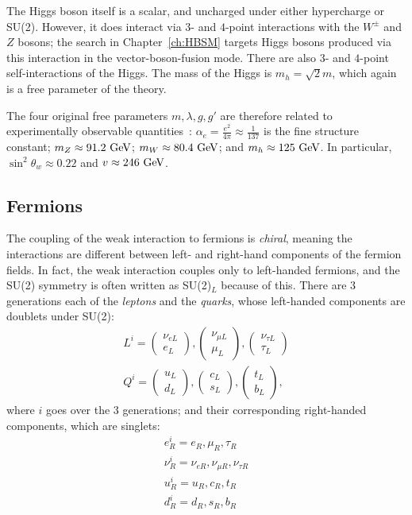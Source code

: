 The Higgs boson itself is a scalar, and uncharged under either hypercharge or SU(2).
However, it does interact via $3$- and $4$-point interactions with the $W^\pm$ and $Z$ bosons; the search in Chapter~\ref{ch:HBSM} targets Higgs bosons produced via this interaction in the vector-boson-fusion mode.
There are also $3$- and $4$-point self-interactions of the Higgs.
The mass of the Higgs is $m_h = \sqrt{2}m$, which again is a free parameter of the theory.

The four original free parameters $m,\lambda,g,g'$ are therefore related to experimentally observable quantities~\cite{PDG}: $\alpha_e = \frac{e^2}{4\pi} \approx \frac{1}{137}$ is the fine structure constant; $m_Z \approx 91.2~\mathrm{GeV}$; $m_W \approx 80.4~\mathrm{GeV}$; and $m_h \approx 125~\mathrm{GeV}$.
In particular, $\sin^2\theta_w \approx 0.22$ and $v \approx 246~\mathrm{GeV}$.

\subsection{Fermions}
\label{sec:SM:EW_matter}
The coupling of the weak interaction to fermions is \textit{chiral}, meaning the interactions are different between left- and right-hand components of the fermion fields.
In fact, the weak interaction couples only to left-handed fermions, and the SU(2) symmetry is often written as SU(2)$_L$ because of this.
There are $3$ generations each of the \textit{leptons} and the \textit{quarks}, whose left-handed components are doublets under SU(2):
\begin{align}
L^i = \begin{pmatrix}\nu_{eL}\\e_L\end{pmatrix},\begin{pmatrix}\nu_{\mu L}\\\mu_L\end{pmatrix},\begin{pmatrix}\nu_{\tau L}\\\tau_L\end{pmatrix}\\
Q^i = \begin{pmatrix}u_{L}\\d_L\end{pmatrix},\begin{pmatrix}c_{L}\\s_L\end{pmatrix},\begin{pmatrix}t_{L}\\b_L\end{pmatrix},
\end{align}
where $i$ goes over the $3$ generations; and their corresponding right-handed components, which are singlets:
\begin{align}
e^i_R = e_R,\mu_R,\tau_R\\
\nu^i_R = \nu_{eR},\nu_{\mu R},\nu_{\tau R}\\
u^i_R = u_R,c_R,t_R\\
d^i_R = d_R,s_R,b_R
\end{align}

